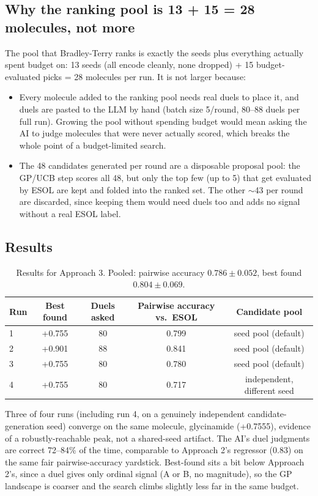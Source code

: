 \subsection{Why the ranking pool is 13 + 15 = 28 molecules, not more}
The pool that Bradley-Terry ranks is exactly the seeds plus everything actually spent budget on: 13 seeds (all encode cleanly, none dropped) + 15 budget-evaluated picks = 28 molecules per run. It is not larger because:
\begin{itemize}
    \item Every molecule added to the ranking pool needs real duels to place it, and duels are pasted to the LLM by hand (batch size 5/round, 80--88 duels per full run). Growing the pool without spending budget would mean asking the AI to judge molecules that were never actually scored, which breaks the whole point of a budget-limited search.
    \item The 48 candidates generated per round are a disposable proposal pool: the GP/UCB step scores all 48, but only the top few (up to 5) that get evaluated by ESOL are kept and folded into the ranked set. The other $\sim$43 per round are discarded, since keeping them would need duels too and adds no signal without a real ESOL label.
\end{itemize}

\subsection{Results}
\begin{table}[h]
\centering
\begin{tabular}{lcccc}
\hline
Run & Best found & Duels asked & Pairwise accuracy vs.\ ESOL & Candidate pool \\
\hline
1 & +0.755 & 80 & 0.799 & seed pool (default) \\
2 & +0.901 & 88 & 0.841 & seed pool (default) \\
3 & +0.755 & 80 & 0.780 & seed pool (default) \\
4 & +0.755 & 80 & 0.717 & independent, different seed \\
\hline
\end{tabular}
\caption{Results for Approach 3. Pooled: pairwise accuracy $0.786 \pm 0.052$, best found $0.804 \pm 0.069$.}
\label{tab:results_a3}
\end{table}

Three of four runs (including run 4, on a genuinely independent candidate-generation seed) converge on the same molecule, glycinamide (+0.7555), evidence of a robustly-reachable peak, not a shared-seed artifact. The AI's duel judgments are correct 72--84\% of the time, comparable to Approach 2's regressor (0.83) on the same fair pairwise-accuracy yardstick. Best-found sits a bit below Approach 2's, since a duel gives only ordinal signal (A or B, no magnitude), so the GP landscape is coarser and the search climbs slightly less far in the same budget.

